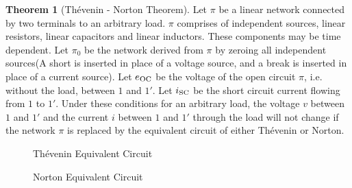 \documentclass[fleqn, a4paper, 12pt, twoside]{article}
\theoremstyle{definition}
\theoremstyle{theorem}
\newtheorem{theorem}{Theorem}
\begin{document}
\begin{theorem}[Th\'{e}venin - Norton Theorem]
	Let $\pi$ be a linear network connected by two terminals to an arbitrary load. $\pi$ comprises of independent sources, linear resistors, linear capacitors and linear inductors. These components may be time dependent. Let $\pi_0$ be the network derived from $\pi$ by zeroing all independent sources(A short is inserted in place of a voltage source, and a break is inserted in place of a current source). Let $e_{\textnormal{OC}}$ be the voltage of the open circuit $\pi$, i.e. without the load, between $1$ and $1'$. Let $i_{\textnormal{SC}}$ be the short circuit current flowing from $1$ to $1'$. Under these conditions for an arbitrary load, the voltage $v$ between $1$ and $1'$ and the current $i$ between $1$ and $1'$ through the load will not change if the network $\pi$ is replaced by the equivalent circuit of either Th\'{e}venin or Norton.
	\begin{figure}[H]
	\end{figure}
	\begin{figure}[H]
		\caption{Th\'{e}venin Equivalent Circuit}
	\end{figure}
	\begin{figure}[H]
		\caption{Norton Equivalent Circuit}
	\end{figure}
\end{theorem}
\end{document}
